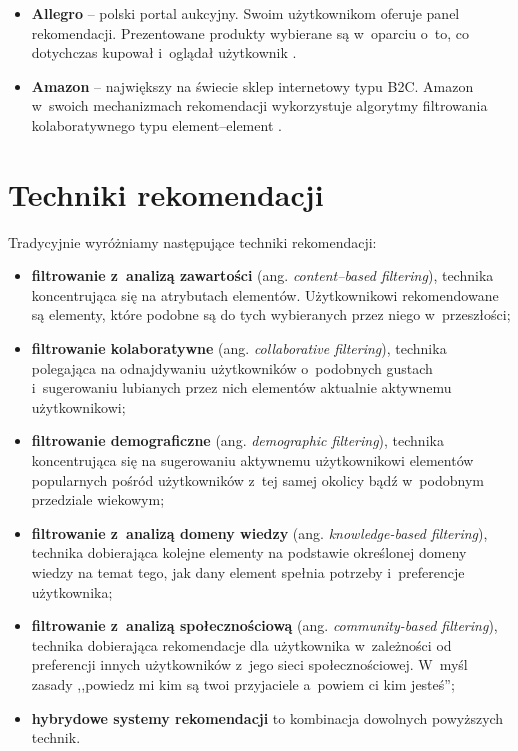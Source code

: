 \documentclass[twoside]{iisthesis}
\begin{document}
	 \begin{itemize}
	 	\item \textbf{Allegro} -- polski portal aukcyjny. Swoim użytkownikom oferuje panel rekomendacji. Prezentowane produkty wybierane są w~oparciu o~to, co dotychczas kupował i~oglądał użytkownik \cite{id:allegrofaq}. 
	 	\item \textbf{Amazon} -- największy na świecie sklep internetowy typu B2C. Amazon w~swoich mechanizmach rekomendacji wykorzystuje algorytmy filtrowania kolaboratywnego typu element--element \cite{id:linden2003amazon}.
	 \end{itemize}	 
	 
	 
	 
	 \section{Techniki rekomendacji}
 
	 Tradycyjnie wyróżniamy następujące techniki rekomendacji: 
	 
	 \begin{itemize}
	 	\item \textbf{filtrowanie z~analizą zawartości} (ang. \textit{content--based filtering}), technika koncentrująca się na atrybutach elementów. Użytkownikowi rekomendowane są elementy, które podobne są do tych wybieranych przez niego w~przeszłości;
	 	\item \textbf{filtrowanie kolaboratywne} (ang. \textit{collaborative filtering}), technika polegająca na odnajdywaniu użytkowników o~podobnych gustach i~sugerowaniu lubianych przez nich elementów aktualnie aktywnemu użytkownikowi;
	 	\item \textbf{filtrowanie demograficzne} (ang. \textit{demographic filtering}), technika koncentrująca się na sugerowaniu aktywnemu użytkownikowi elementów popularnych pośród użytkowników z~tej samej okolicy bądź w~podobnym przedziale wiekowym;
	 	\item \textbf{filtrowanie z~analizą domeny wiedzy} (ang. \textit{knowledge-based filtering}), technika dobierająca kolejne elementy na podstawie określonej domeny wiedzy na temat tego, jak dany element spełnia potrzeby i~preferencje użytkownika;	
	 	\item \textbf{filtrowanie z~analizą społecznościową} (ang. \textit{community-based filtering}), technika dobierająca rekomendacje dla użytkownika w~zależności od preferencji innych użytkowników z~jego sieci społecznościowej. W~myśl zasady ,,powiedz mi kim są twoi przyjaciele a~powiem ci kim jesteś'';
	 	\item \textbf{hybrydowe systemy rekomendacji} to kombinacja dowolnych powyższych technik.
	 \end{itemize}
	 
\end{document}
